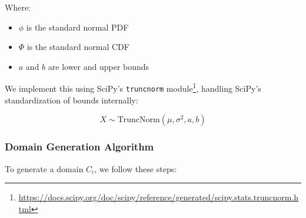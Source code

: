Where:
\begin{itemize}
    \item $\phi$ is the standard normal PDF
    \item $\Phi$ is the standard normal CDF
    \item $a$ and $b$ are lower and upper bounds
\end{itemize}

We implement this using SciPy's \texttt{truncnorm} module\footnote{\url{https://docs.scipy.org/doc/scipy/reference/generated/scipy.stats.truncnorm.html}},
handling SciPy's standardization of bounds internally:

\begin{equation*}
    X \sim \text{TruncNorm}(\mu, \sigma^2, a, b)
\end{equation*}

\subsubsection{Domain Generation Algorithm}

To generate a domain $C_i$, we follow these steps:


